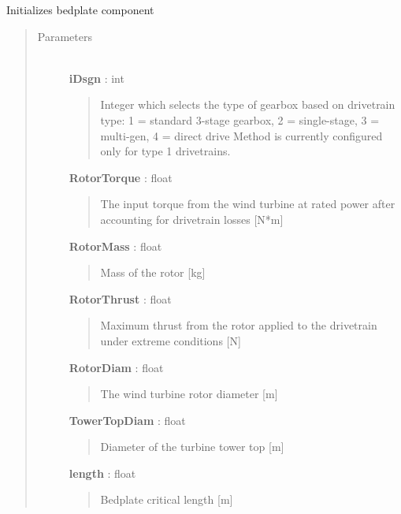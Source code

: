 \documentclass[letterpaper,10pt,openany,oneside]{sphinxmanual}
\begin{document}
\begin{fulllineitems}
\label{documentation:nacelleSE.src.nacelle_components.Bedplate}
Initializes bedplate component
\begin{quote}\begin{description}
\item[{Parameters }] \leavevmode\\
\textbf{iDsgn} : int
\begin{quote}

Integer which selects the type of gearbox based on drivetrain type: 1 = standard 3-stage gearbox, 2 = single-stage, 3 = multi-gen, 4 = direct drive
Method is currently configured only for type 1 drivetrains.
\end{quote}

\textbf{RotorTorque} : float
\begin{quote}

The input torque from the wind turbine at rated power after accounting for drivetrain losses {[}N*m{]}
\end{quote}

\textbf{RotorMass} : float
\begin{quote}

Mass of the rotor {[}kg{]}
\end{quote}

\textbf{RotorThrust} : float
\begin{quote}

Maximum thrust from the rotor applied to the drivetrain under extreme conditions {[}N{]}
\end{quote}

\textbf{RotorDiam} : float
\begin{quote}

The wind turbine rotor diameter {[}m{]}
\end{quote}

\textbf{TowerTopDiam} : float
\begin{quote}

Diameter of the turbine tower top {[}m{]}
\end{quote}

\textbf{length} : float
\begin{quote}

Bedplate critical length {[}m{]}
\end{quote}


\end{description}
\end{quote}
\end{fulllineitems}
\end{document}
